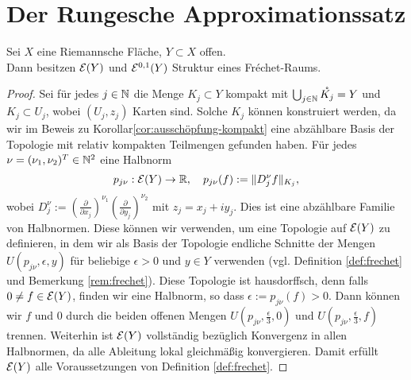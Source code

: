 
\section{Der Rungesche Approximationssatz}
\label{sec:Runge}

\begin{prop}
  \label{prop:diff-frechet}
  Sei $X$ eine Riemannsche Fläche, $Y \subset X$ offen. \\
  Dann besitzen $\mathcal{E}(Y)$ und $\mathcal{E}^{0,1}(Y)$ Struktur eines Fr\'echet-Raums.
\end{prop}

\begin{proof}
  Sei für jedes $j \in \mathbb{N}$ die Menge $K_j \subset Y$ kompakt mit $\bigcup_{j \in \mathbb{N}}
  \mathring{K_j} = Y$ und $K_j \subset U_j$, wobei $(U_j, z_j)$ Karten
  sind. Solche $K_j$ können konstruiert werden, da wir im Beweis zu
  Korollar\ref{cor:ausschöpfung-kompakt} eine abzählbare Basis der
  Topologie mit relativ kompakten Teilmengen gefunden haben.
  Für jedes $\nu = (\nu_1, \nu_2)^T \in \mathbb{N}^2$ eine Halbnorm
  \[
  p_{j\nu}: \mathcal{E}(Y) \rightarrow \mathbb{R}, \quad p_{j\nu}(f) := \|D_j^\nu f\|_{K_j},
  \]
  wobei $D^\nu_j := \left ( \frac{\partial}{\partial x_j} \right
  )^{\nu_1} \left ( \frac{\partial}{\partial y_j} \right )^{\nu_2}$
  mit $z_j = x_j + iy_j$. Dies ist eine abzählbare Familie von
  Halbnormen. Diese können wir verwenden, um eine Topologie auf
  $\mathcal{E}(Y)$ zu definieren, in dem wir als Basis der Topologie
  endliche Schnitte der Mengen $U(p_{j\nu}, \epsilon, y)$ für
  beliebige $\epsilon > 0$ und $y \in Y$ verwenden (vgl. Definition
  \ref{def:frechet} und Bemerkung \ref{rem:frechet}). Diese Topologie
  ist hausdorffsch, denn falls $0 \neq f \in \mathcal{E}(Y)$, finden wir
  eine Halbnorm, so dass $\epsilon := p_{j\nu}(f) > 0$. Dann können wir $f$ und 0
  durch die beiden offenen Mengen $U(p_{j\nu}, \frac{\epsilon}{3}, 0)$
  und $U(p_{j\nu}, \frac{\epsilon}{3}, f)$ trennen. Weiterhin ist
  $\mathcal{E}(Y)$ vollständig bezüglich Konvergenz in allen Halbnormen, da
  alle Ableitung lokal gleichmäßig konvergieren. Damit erfüllt
  $\mathcal{E}(Y)$ alle Voraussetzungen von Definition \ref{def:frechet}.
  

\end{proof}
